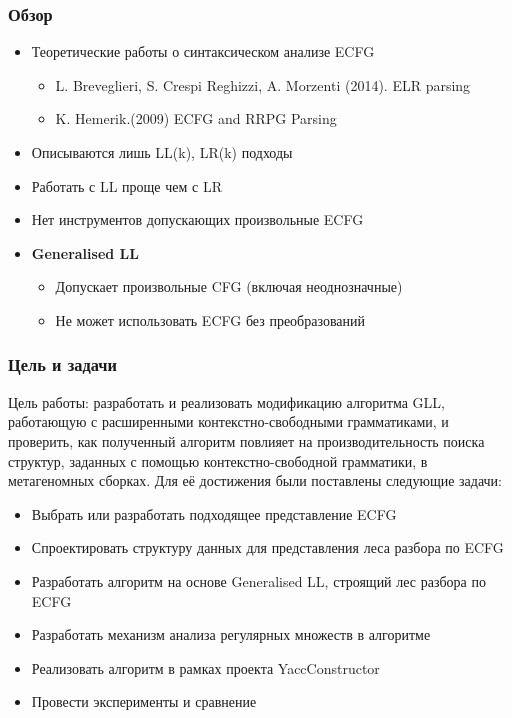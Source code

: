 \documentclass{beamer}
\begin{document}
	
	\begin{frame} 
		\frametitle{Обзор} 
		\begin{itemize}
			\item Теоретические работы о синтаксическом анализе ECFG
			\begin{itemize}
				\item L. Breveglieri, S. Crespi Reghizzi, A. Morzenti (2014). ELR parsing
				\item K. Hemerik.(2009) ECFG and RRPG Parsing
   			\end{itemize}
            \item Описываются лишь LL(k), LR(k) подходы
            \item Работать с LL проще чем с LR
        
            \item Нет инструментов допускающих произвольные ECFG
			\item \textbf{Generalised LL}
			\begin{itemize}
				\item Допускает произвольные CFG (включая неоднозначные)
				\item Не может использовать ECFG без преобразований
			\end{itemize}
		\end{itemize}
	\end{frame}

 

	\begin{frame} 
		\frametitle{Цель и задачи}
		Цель работы: разработать и реализовать модификацию алгоритма GLL, работающую с расширенными контекстно-свободными грамматиками, и проверить, как полученный алгоритм повлияет на производительность поиска структур, заданных с помощью контекстно-свободной грамматики, в метагеномных сборках.
		Для её достижения были поставлены следующие задачи:
		\begin{itemize}
			\item Выбрать или разработать подходящее представление ECFG
			\item Спроектировать структуру данных для представления леса разбора по ECFG
			\item Разработать алгоритм на основе Generalised LL, строящий лес разбора по ECFG
            \item Разработать механизм анализа регулярных множеств в алгоритме
			\item Реализовать алгоритм в рамках проекта YaccConstructor
			\item Провести эксперименты и сравнение
		\end{itemize}
	\end{frame}
\end{document}
